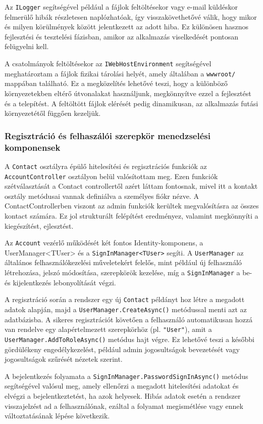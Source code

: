 Az \texttt{ILogger} segítségével például a fájlok feltöltésekor vagy e-mail küldéskor felmerülő hibák részletesen naplózhatóak, így visszakövethetővé válik, hogy mikor és milyen körülmények között jelentkezett az adott hiba. Ez különösen hasznos fejlesztési és tesztelési fázisban, amikor az alkalmazás viselkedését pontosan felügyelni kell.

A csatolmányok feltöltésekor az \texttt{IWebHostEnvironment} segítségével meghatároztam a fájlok fizikai tárolási helyét, amely általában a \texttt{wwwroot/} mappában található. Ez a megközelítés lehetővé teszi, hogy a különböző környezetekben eltérő útvonalakat használjunk, megkönnyítve ezzel a fejlesztést és a telepítést. A feltöltött fájlok elérését pedig dinamikusan, az alkalmazás futási környezetétől függően kezeljük.
\subsubsection{Regisztráció és felhaszálói szerepkör menedzselési komponensek}
A \texttt{Contact} osztályra épülő hitelesítési és regisztrációs funkciók az \texttt{AccountController} osztályon belül valósítottam meg. Ezen funkciók szétválasztását a Contact controllertől azért láttam fontosnak, mivel itt a kontakt osztály metódusai vannak definiálva a személyes fiókr nézve. A ContactControllerben viszont az admin funkciók kerültek megvalósításra az összes kontact számára. Ez jol strukturált felépítést eredményez, valamint megkönnyíti a kiegészítést, ejlesztést. 

Az \texttt{Account} vezérlő működését két fontos Identity-komponens, a UserManager<TUser> és a \texttt{SignInManager<TUser>} segíti. A \texttt{UserManager} az általános felhasználókezelési műveletekért felelős, mint például új felhasználó létrehozása, jelszó módosítása, szerepkörök kezelése, míg a \texttt{SignInManager} a be- és kijelentkezés lebonyolítását végzi.

A regisztráció során a rendszer egy új \texttt{Contact} példányt hoz létre a megadott adatok alapján, majd a \texttt{UserManager.CreateAsync()} metódussal menti azt az adatbázisba. A sikeres regisztrációt követően a felhasználó automatikusan hozzá van rendelve egy alapértelmezett szerepkörhöz (pl. \texttt{"User"}), amit a \texttt{UserManager.AddToRoleAsync()} metódus hajt végre. Ez lehetővé teszi a későbbi gördülékeny engedélykezelést, például admin jogosultságok bevezetését vagy jogosultságok szűrését nézetek szerint.

A bejelentkezés folyamata a \texttt{SignInManager.PasswordSignInAsync()} metódus segítségével valósul meg, amely ellenőrzi a megadott hitelesítési adatokat és elvégzi a bejelentkeztetést, ha azok helyesek. Hibás adatok esetén a rendszer visszajelzést ad a felhasználónak, ezáltal a folyamat megismétlése vagy ennek változtatásának lépése következik.

